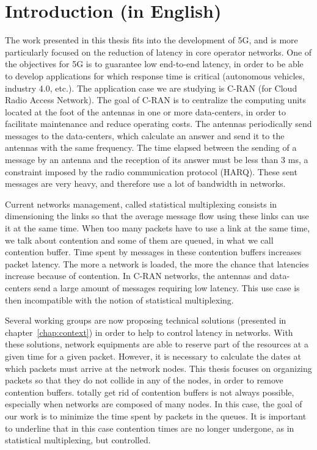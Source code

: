 \chapter*{Introduction (in English)}
\label{chap:introen}


The work presented in this thesis fits into the development of 5G, and is more particularly focused on the reduction of latency in core operator networks.
One of the objectives for 5G is to guarantee low end-to-end latency, in order to be able to develop applications for which response time is critical (autonomous vehicles, industry 4.0, etc.).
The application case we are studying is C-RAN (for Cloud Radio Access Network). The goal of C-RAN is to centralize the computing units located at the foot of the antennas in one or more data-centers, in order to facilitate maintenance and reduce operating costs. The antennas periodically send messages to the data-centers, which calculate an answer and send it to the antennas with the same frequency. The time elapsed between the sending of a message by an antenna and the reception of its answer must be less than $3$ ms, a constraint imposed by the radio communication protocol (HARQ). These sent messages are very heavy, and therefore use a lot of bandwidth in networks.

Current networks management, called statistical multiplexing consists in dimensioning the links so that the average message flow using these links can use it at the same time. When too many packets have to use a link at the same time, we talk about contention and some of them are queued, in what we call contention buffer. Time spent by messages in these contention buffers increases packet latency. The more a network is loaded, the more the chance that latencies increase because of contention. In C-RAN networks, the antennas and data-centers send a large amount of messages requiring low latency. This use case is then incompatible with the notion of statistical multiplexing.

Several working groups are now proposing technical solutions (presented in chapter~\ref{chap:context}) in order to help to control latency in networks. With these solutions, network equipments are able to reserve part of the resources at a given time for a given packet. However, it is necessary to calculate the dates at which packets must arrive at the network nodes. This thesis focuses on organizing packets so that they do not collide in any of the nodes, in order to remove contention buffers. totally get rid of contention buffers is not always possible, especially when networks are composed of many nodes. In this case, the goal of our work is to minimize the time spent by packets in the queues. It is important to underline that in this case contention times are no longer undergone, as in statistical multiplexing, but controlled.

